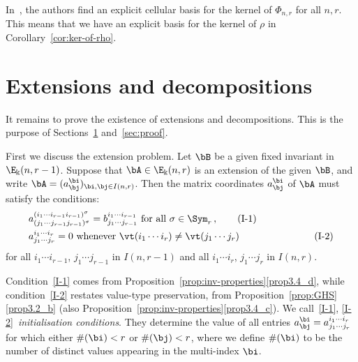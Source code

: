 In~\cite{BDM:second}, the authors find an explicit cellular basis for
the kernel of $\Phi_{n,r}$ for all $n,r$. This means that we have an
explicit basis for the kernel of $\rho$ in Corollary~\ref{cor:ker-of-rho}. 



\section{Extensions and decompositions}\label{sec:extensions}%
It remains to prove the existence of extensions and
decompositions. This is the purpose of Sections~\ref{sec:extensions}
and~\ref{sec:proof}. 

First we discuss the extension problem. Let $\bB$ be a given fixed
invariant in $\E_\Bbbk(n,r-1)$. Suppose that $\bA \in \E_\Bbbk(n,r)$
is an extension of the given $\bB$, and write $\bA =
(a^\bi_\bj)_{\bi,\bj \in I(n,r)}$. Then the matrix coordinates
$a^\bi_\bj$ of $\bA$ must satisfy the conditions:
\begin{align}
 & a^{(i_1\cdots i_{r-1} i_{r-1})^\sigma}_{(j_1\cdots j_{r-1}
 j_{r-1})^\sigma} = b^{i_1\cdots i_{r-1}}_{j_1\cdots j_{r-1}} \text{ for
 all } \sigma \in \Sym_r \, , \tag{I-1} \label{I-1}\\
 & a^{i_1\cdots i_r}_{j_1\cdots j_r} = 0 \text{ whenever }
 \vt(i_1\cdots i_r) \ne \vt(j_1 \cdots j_r) \hspace{2cm}\tag{I-2}\label{I-2}
\end{align}
for all $i_1\cdots i_{r-1}$, $j_1\cdots j_{r-1}$ in $I(n,r-1)$ and all
$i_1\cdots i_r$, $j_1\cdots j_r$ in $I(n,r)$.

Condition~\eqref{I-1} comes from Proposition~\ref{prop:inv-properties}\ref{prop3.4_d},
while condition~\eqref{I-2} restates value-type preservation, from
Proposition~\ref{prop:GHS}\ref{prop3.2_b} (also Proposition~\ref{prop:inv-properties}\ref{prop3.4_c}). We call~\eqref{I-1}, \eqref{I-2}~\emph{initialisation conditions}. They determine the value of all
entries $a^\bi_\bj = a^{i_1 \cdots i_r}_{j_1\cdots j_r}$ for which
either $\#(\bi)<r$ or $\#(\bj)<r$, where we define $\#(\bi)$ to be the
number of distinct values appearing in the multi-index $\bi$. 

